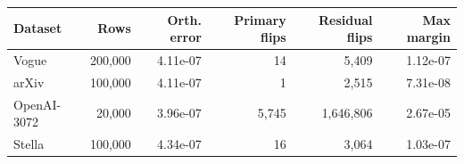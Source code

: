 \begin{tabular}{@{}lrrrrr@{}}
\toprule
Dataset & Rows & Orth. error & Primary flips & Residual flips & Max margin \\
\midrule
Vogue & 200,000 & 4.11e-07 & 14 & 5,409 & 1.12e-07 \\
arXiv & 100,000 & 4.11e-07 & 1 & 2,515 & 7.31e-08 \\
OpenAI-3072 & 20,000 & 3.96e-07 & 5,745 & 1,646,806 & 2.67e-05 \\
Stella & 100,000 & 4.34e-07 & 16 & 3,064 & 1.03e-07 \\
\bottomrule
\end{tabular}

